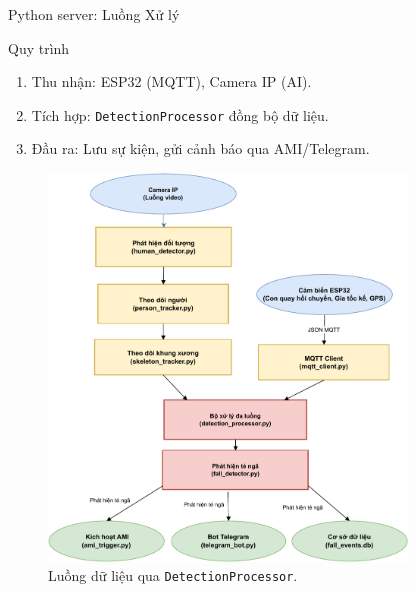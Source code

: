 \begin{frame}[fragile]{Python server: Luồng Xử lý}
    \begin{block}{Quy trình}
        \begin{enumerate}
            \item Thu nhận: ESP32 (MQTT), Camera IP (AI).
            \item Tích hợp: \texttt{DetectionProcessor} đồng bộ dữ liệu.
            \item Đầu ra: Lưu sự kiện, gửi cảnh báo qua AMI/Telegram.
        \end{enumerate}
    \end{block}
    \begin{figure}
        \centering
        \includegraphics[width=0.85\textwidth,height=0.5\textheight,keepaspectratio]{images/server_flow.pdf}
        \caption{Luồng dữ liệu qua \texttt{DetectionProcessor}.}
        \label{fig:server_flow}
    \end{figure}
\end{frame}

